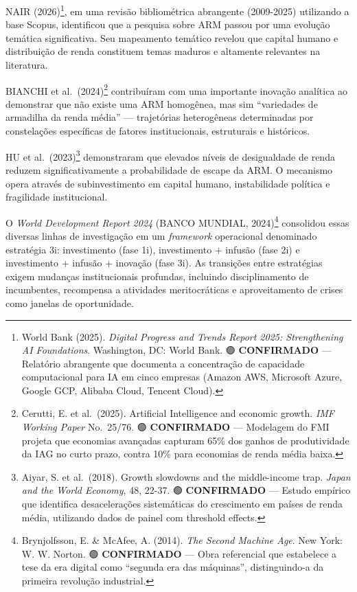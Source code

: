 \documentclass[
  brazilian,
  12pt,
]{article}
\begin{document}
NAIR (2026)\footnote{World Bank (2025). \emph{Digital Progress and Trends Report 2025: Strengthening AI Foundations}. Washington, DC: World Bank. 🟢 \textbf{CONFIRMADO} --- Relatório abrangente que documenta a concentração de capacidade computacional para IA em cinco empresas (Amazon AWS, Microsoft Azure, Google GCP, Alibaba Cloud, Tencent Cloud).}, em uma revisão bibliométrica abrangente (2009-2025) utilizando a base Scopus, identificou que a pesquisa sobre ARM passou por uma evolução temática significativa. Seu mapeamento temático revelou que capital humano e distribuição de renda constituem temas maduros e altamente relevantes na literatura.

BIANCHI et al.~(2024)\footnote{Cerutti, E. et al.~(2025). Artificial Intelligence and economic growth. \emph{IMF Working Paper} No.~25/76. 🟢 \textbf{CONFIRMADO} --- Modelagem do FMI projeta que economias avançadas capturam 65\% dos ganhos de produtividade da IAG no curto prazo, contra 10\% para economias de renda média baixa.} contribuíram com uma importante inovação analítica ao demonstrar que não existe uma ARM homogênea, mas sim ``variedades de armadilha da renda média'' --- trajetórias heterogêneas determinadas por constelações específicas de fatores institucionais, estruturais e históricos.

HU et al.~(2023)\footnote{Aiyar, S. et al.~(2018). Growth slowdowns and the middle-income trap. \emph{Japan and the World Economy}, 48, 22-37. 🟢 \textbf{CONFIRMADO} --- Estudo empírico que identifica desacelerações sistemáticas do crescimento em países de renda média, utilizando dados de painel com threshold effects.} demonstraram que elevados níveis de desigualdade de renda reduzem significativamente a probabilidade de escape da ARM. O mecanismo opera através de subinvestimento em capital humano, instabilidade política e fragilidade institucional.

O \emph{World Development Report 2024} (BANCO MUNDIAL, 2024)\footnote{Brynjolfsson, E. \& McAfee, A. (2014). \emph{The Second Machine Age}. New York: W. W. Norton. 🟢 \textbf{CONFIRMADO} --- Obra referencial que estabelece a tese da era digital como ``segunda era das máquinas'', distinguindo-a da primeira revolução industrial.} consolidou essas diversas linhas de investigação em um \emph{framework} operacional denominado estratégia 3i: investimento (fase 1i), investimento + infusão (fase 2i) e investimento + infusão + inovação (fase 3i). As transições entre estratégias exigem mudanças institucionais profundas, incluindo disciplinamento de incumbentes, recompensa a atividades meritocráticas e aproveitamento de crises como janelas de oportunidade.
\end{document}
